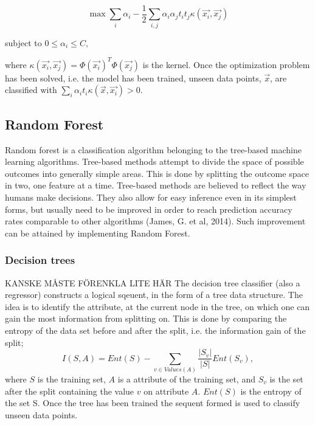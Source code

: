 \documentclass{article}
\begin{document}
\begin{equation}
\max \sum\limits_i \alpha_i - \frac{1}{2}\sum\limits_{i,j} \alpha_i \alpha_j t_i t_j \kappa (\vec{x_i}, \vec{x_j}) 
\end{equation}
\begin{center}
subject to $0 \leq \alpha_i \leq C, $
\end{center}
where $\kappa (\vec{x_i}, \vec{x_j}) = \Phi(\vec{x_i})^T \Phi(\vec{x_j})$ is the kernel. Once the optimization problem has been solved, i.e. the model has been trained, unseen data points, $\vec{x}$,  are classified with $\sum\limits_i \alpha_i t_i \kappa(\vec{x},\vec{x_i}) > 0$. 


\subsection{Random Forest}
Random forest is a classification algorithm belonging to the tree-based machine learning algorithms. Tree-based methods attempt to divide the space of possible outcomes into generally simple areas. This is done by splitting the outcome space in two, one feature at a time. Tree-based methods are believed to reflect the way humans make decisions. They also allow for easy inference even in its simplest forms, but usually need to be improved in order to reach prediction accuracy rates comparable to other algorithms (James, G. et al, 2014). Such improvement can be attained by implementing Random Forest.

\subsubsection{Decision trees}
KANSKE MÅSTE FÖRENKLA LITE HÄR
The decision tree classifier (also a regressor) constructs a logical sqeuent, in the form of a tree data structure. The idea is to identify the attribute, at the current node in the tree, on which one can gain the most information from splitting on. This is done by comparing the entropy of the data set before and after the split, i.e. the information gain of the split;
\begin{equation}
I(S, A) = Ent(S) - \sum\limits_{v \in Values(A)} \frac{|S_v|}{|S|} Ent(S_v),
\end{equation}
where $S$ is the training set, $A$ is a attribute of the training set, and $S_v$ is the set after the split containing the value $v$ on attribute $A$. $Ent(S)$ is the entropy of the set S. Once the tree has been trained the sequent formed is used to classify unseen data points.
\end{document}
